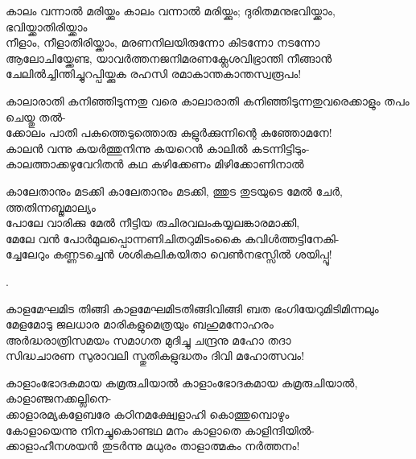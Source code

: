 \begin{enumerate}


\begin{slokam}{\VSr}{\VKG}{കാലം വന്നാൽ മരിയ്ക്കും}
കാലം വന്നാൽ മരിയ്ക്കും; ദുരിതമനുഭവിയ്ക്കാം, ഭവിയ്ക്കാതിരിയ്ക്കാം\\
നീളാം, നീളാതിരിയ്ക്കാം, മരണനിലയിരുന്നോ കിടന്നോ നടന്നോ\\
ആലോചിയ്ക്കേണ്ട, യാവർത്തനജനിമരണക്ലേശവിഭ്രാന്തി നീങ്ങാൻ\\
ചേലിൽച്ചിന്തിച്ചുറപ്പിയ്ക്കുക രഹസി രമാകാന്തകാന്തസ്വരൂപം!
\end{slokam}



\begin{slokam}{\VSv}{\SVL}{കാലാരാതി കനിഞ്ഞിടുന്നതു വരെ}
കാലാരാതി കനിഞ്ഞിടുന്നതുവരെക്കാളും തപം ചെയ്തു തൽ-\\
ക്കോലം പാതി പകുത്തെടുത്തൊരു കുളുർക്കുന്നിന്റെ കുഞ്ഞോമനേ!\\
കാലൻ വന്നു കയർത്തുനിന്നു കയറെൻ കാലിൽ കടന്നിട്ടിടും-\\
കാലത്താക്കഴുവേറിതൻ കഥ കഴിക്കേണം മിഴിക്കോണിനാൽ
\end{slokam}


\begin{slokam}{\VSr}{\VNM}{കാലേതാനും മടക്കി}
കാലേതാനും മടക്കി, ത്തുട തുടയുടെ മേൽ ചേർ, ത്തതിന്നബ്ജമാല്യം\\
പോലേ വാരിക്കു മേൽ നീട്ടിയ രുചിരവലംകയ്യലങ്കാരമാക്കി,\\
മേലേ വൻ പോർമുലപ്പൊന്നണിചിതറുമിടംകൈ കവിള്‍ത്തട്ടിനേകി-\\
ച്ചേലേറും കണ്ണടച്ചെൻ ശശികലികയിതാ വെൺനഭസ്സിൽ ശയിപ്പൂ!
\end{slokam}


.


\begin{slokam}{\VKm}{\KN}{കാളമേഘമിട തിങ്ങി}
കാളമേഘമിടതിങ്ങിവിങ്ങി ബത ഭംഗിയേറുമിടിമിന്നലും \\
മേളമോടു ജലധാര മാരികളുമെത്രയും ബഹുമനോഹരം \\
അർദ്ധരാത്രിസമയം സമാഗത മുദിച്ചു ചന്ദ്രനു മഹോ തദാ \\
സിദ്ധചാരണ സുരാവലി സ്തുതികളുദ്ധതം ദിവി മഹോത്സവം! 
\end{slokam}


\begin{slokam}{\VSv}{\Unk}{കാളാംഭോദകമായ കമ്രരുചിയാൽ}
കാളാംഭോദകമായ കമ്രരുചിയാൽ, കാളാഞ്ജനക്കല്ലിനെ-\\
ക്കാളാരമ്യകളേബരേ കഠിനമക്ഷ്വേളാഹി കൊത്തുമ്പൊഴും\\
കോളായെന്നു നിനച്ചുകൊണ്ടഥ മനം കാളാതെ കാളിന്ദിയിൽ-\\
ക്കാളാഹീനശയൻ തുടർന്നു മധുരം താളാത്മകം നർത്തനം!
\end{slokam}


\end{enumerate}
